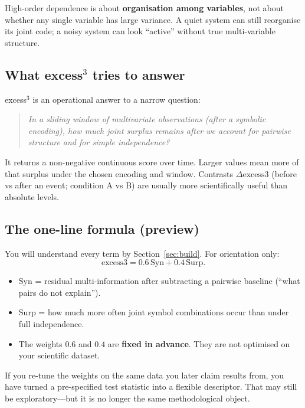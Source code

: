 \documentclass[11pt,a4paper]{article}
\begin{document}
\begin{keyidea}
High-order dependence is about \textbf{organisation among variables}, not
about whether any single variable has large variance. A quiet system can
still reorganise its joint code; a noisy system can look ``active'' without
true multi-variable structure.
\end{keyidea}

\subsection{What excess$^3$ tries to answer}

excess$^3$ is an operational answer to a narrow question:

\begin{quote}
\emph{In a sliding window of multivariate observations (after a symbolic
encoding), how much joint surplus remains after we account for pairwise
structure and for simple independence?}
\end{quote}

It returns a non-negative continuous score over time. Larger values mean
more of that surplus under the chosen encoding and window. Contrasts
$\Delta\mathrm{excess3}$ (before vs after an event; condition A vs B) are
usually more scientifically useful than absolute levels.

\subsection{The one-line formula (preview)}

You will understand every term by Section~\ref{sec:build}. For orientation
only:
\begin{equation}
\label{eq:preview}
\mathrm{excess3}
=
0.6\,\mathrm{Syn}
+
0.4\,\mathrm{Surp}.
\end{equation}
\begin{itemize}[leftmargin=*,itemsep=2pt]
  \item $\mathrm{Syn}$ = residual multi-information after subtracting a
  pairwise baseline (``what pairs do not explain'').
  \item $\mathrm{Surp}$ = how much more often joint symbol combinations
  occur than under full independence.
  \item The weights $0.6$ and $0.4$ are \textbf{fixed in advance}. They are
  not optimised on your scientific dataset.
\end{itemize}

\begin{warningbox}
If you re-tune the weights on the same data you later claim results from,
you have turned a pre-specified test statistic into a flexible descriptor.
That may still be exploratory---but it is no longer the same methodological
object.
\end{warningbox}
\end{document}
